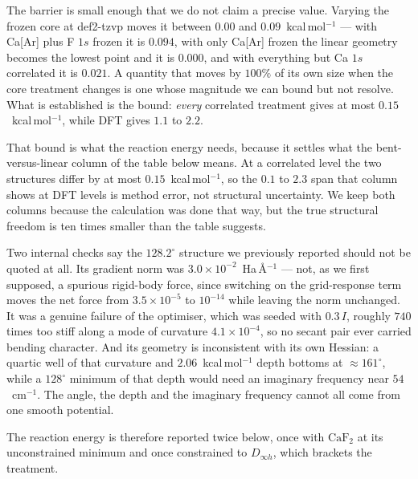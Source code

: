 The barrier is small enough that we do not claim a precise value. Varying the frozen
core at def2-tzvp moves it between $0.00$ and $0.09$~kcal\,mol$^{-1}$ --- with
Ca[Ar] plus F $1s$ frozen it is $0.094$, with only Ca[Ar] frozen the linear geometry
becomes the lowest point and it is $0.000$, and with everything but Ca $1s$ correlated
it is $0.021$. A quantity that moves by $100\%$ of its own size when the core
treatment changes is one whose magnitude we can bound but not resolve. What is
established is the bound: \emph{every} correlated treatment gives at most
$0.15$~kcal\,mol$^{-1}$, while DFT gives $1.1$ to $2.2$.

That bound is what the reaction energy needs, because it settles what the
bent-versus-linear column of the table below means. At a correlated level the two
structures differ by at most $0.15$~kcal\,mol$^{-1}$, so the $0.1$ to $2.3$ span that
column shows at DFT levels is method error, not structural uncertainty. We keep both
columns because the calculation was done that way, but the true structural freedom is
ten times smaller than the table suggests.

Two internal checks say the $128.2^\circ$ structure we previously reported should
not be quoted at all. Its gradient norm was $3.0\times10^{-2}$~Ha\,\AA$^{-1}$ ---
not, as we first supposed, a spurious rigid-body force, since switching on the
grid-response term moves the net force from $3.5\times10^{-5}$ to $10^{-14}$ while
leaving the norm unchanged. It was a genuine failure of the optimiser, which was
seeded with $0.3\,I$, roughly $740$ times too stiff along a mode of curvature
$4.1\times10^{-4}$, so no secant pair ever carried bending character. And its
geometry is inconsistent with its own Hessian: a quartic well of that curvature and
$2.06$~kcal\,mol$^{-1}$ depth bottoms at $\approx161^\circ$, while a
$128^\circ$ minimum of that depth would need an imaginary frequency near
$54$~cm$^{-1}$. The angle, the depth and the imaginary frequency cannot all come
from one smooth potential.

The reaction energy is therefore reported twice below, once with $\mathrm{CaF_2}$
at its unconstrained minimum and once constrained to $D_{\infty h}$, which brackets
the treatment.

